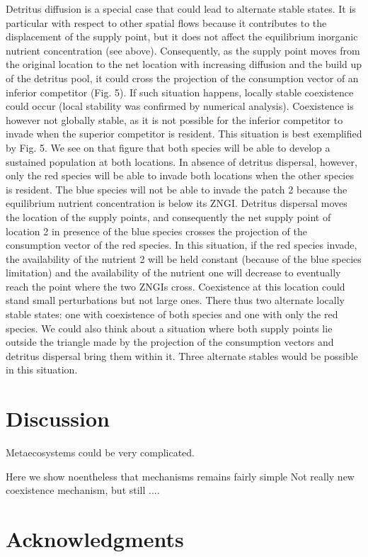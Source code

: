 \documentclass[letterpaper,twocolumn,showkeys]{revtex4-1}
\begin{document}
Detritus diffusion is a special case that could lead to alternate stable states. It is particular with respect to other spatial flows because it contributes to the displacement of the supply point, but it does not affect the equilibrium inorganic nutrient concentration (see above). Consequently, as the supply point moves from the original location to the net location with increasing diffusion and the build up of the detritus pool, it could cross the projection of the consumption vector of an inferior competitor (Fig. 5). If such situation happens, locally stable coexistence could occur (local stability was confirmed by numerical analysis). Coexistence is however not globally stable, as it is not possible for the inferior competitor to invade when the superior competitor is resident. This situation is best exemplified by Fig. 5. We see on that figure that both species will be able to develop a sustained population at both locations. In absence of detritus dispersal, however, only the red species will be able to invade both locations when the other species is resident. The blue species will not be able to invade the patch 2 because the equilibrium nutrient concentration is below its ZNGI. Detritus dispersal moves the location of the supply points, and consequently the net supply point of location 2 in presence of the blue species crosses the projection of the consumption vector of the red species. In this situation, if the red species invade, the availability of the nutrient 2 will be held constant (because of the blue species limitation) and the availability of the nutrient one will decrease to eventually reach the point where the two ZNGIs cross. Coexistence at this location could stand small perturbations but not large ones. There thus two alternate locally stable states: one with coexistence of both species and one with only the red species. We could also think about a situation where both supply points lie outside the triangle made by the projection of the consumption vectors and detritus dispersal bring them within it. Three alternate stables would be possible in this situation. 

\section{Discussion}


Metaecosystems could be very complicated.

Here we show noentheless that mechanisms remains fairly simple
Not really new coexistence mechanism, but still ....





\section{Acknowledgments}
\end{document}
